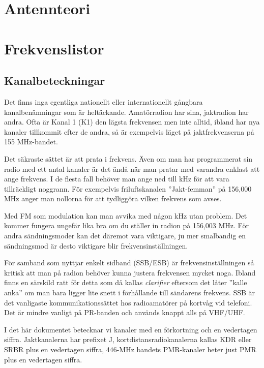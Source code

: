 \documentclass[12ypt,swedish,a4paper]{report}
\begin{document}
\chapter{Antennteori}

\chapter{Frekvenslistor}
\label{kap:frekvenslistor}

\section{Kanalbeteckningar}

Det finns inga egentliga nationellt eller internationellt gångbara kanalbenämningar som är heltäckande. Amatörradion har sina, jaktradion har andra. Ofta är Kanal 1 (K1) den lägsta frekvensen men inte alltid, ibland har nya kanaler tillkommit efter de andra, så är exempelvis läget på jaktfrekvenserna på 155 MHz-bandet.

Det säkraste sättet är att prata i frekvens. Även om man har programmerat sin radio med ett antal kanaler är det ändå när man pratar med varandra enklast att ange frekvens. I de flesta fall behöver man ange ned till kHz för att vara tillräckligt noggrann. För exempelvis friluftskanalen ''Jakt-femman'' på 156,000 MHz anger man nollorna för att tydliggöra vilken frekvens som avses.

Med FM som modulation kan man avvika med någon kHz utan problem. Det kommer fungera ungefär lika bra om du ställer in radion på 156,003 MHz. För andra sändningsmoder kan det däremot vara viktigare, ju mer smalbandig en sändningsmod är desto viktigare blir frekvensinställningen.

För samband som nyttjar enkelt sidband (SSB/ESB) är frekvensinställningen så kritisk att man på radion behöver kunna justera frekvensen mycket noga. Ibland finns en särskild ratt för detta som då kallas \textit{clarifier} eftersom det låter ''kalle anka'' om man bara ligger lite snett i förhållande till sändarens frekvens. SSB är det vanligaste kommunikationssättet hos radioamatörer på kortvåg vid telefoni. Det är mindre vanligt på PR-banden och används knappt alls på VHF/UHF.

I det här dokumentet betecknar vi kanaler med en förkortning och en vedertagen siffra. Jaktkanalerna har prefixet J, kortdistansradiokanalerna kallas KDR eller SRBR plus en vedertagen siffra, 446-MHz bandets PMR-kanaler heter just PMR plus en vedertagen siffra.
\end{document}
